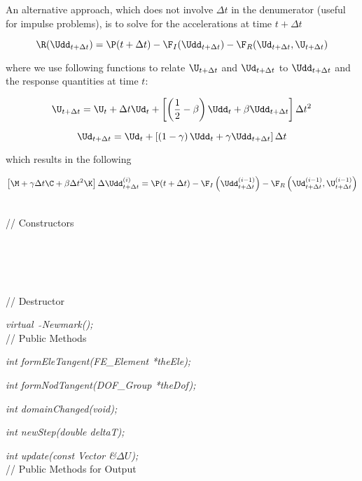 \noindent An alternative approach, which does not involve $\Delta t$
in the denumerator (useful for impulse problems), is to solve for the
accelerations at time $t + \Delta t$ 

$$ \R (\Udd_{t + \Delta t}) = \P(t + \Delta t) - \F_I(\Udd_{t+\Delta t})
- \F_R(\Ud_{t + \Delta t},\U_{t + \Delta t}) $$


\noindent where we use following functions to relate $\U_{t + \Delta
t}$ and $\Ud_{t + \Delta t}$ to $\Udd_{t + \Delta t}$ and the response
quantities at time $t$:

$$
\U_{t + \Delta t} = \U_t + \Delta t \Ud_t + \left[
\left(\frac{1}{2} - \beta\right)\Udd_t + \beta \Udd_{t + \Delta
t}\right] \Delta t^2
$$


$$
\Ud_{t + \Delta t} = \Ud_t + \left[ \left(1 - \gamma\right)\Udd_t +
\gamma\Udd_{t + \Delta t}\right] \Delta t
$$


\noindent which results in the following 

$$ \left[ \M + \gamma \Delta t \C + \beta \Delta t^2 \K \right] \Delta
\Udd_{t + \Delta t}^{(i)} = \P(t + \Delta t) - \F_I\left(\Udd_{t+\Delta 
t}^{(i-1)}\right)
- \F_R\left(\Ud_{t + \Delta t}^{(i-1)},\U_{t + \Delta
t}^{(i-1)}\right) $$



\pagebreak
{} \\
// Constructors 

\\ 
\\ 
\\ \\
// Destructor 

{\em virtual~ $\tilde{}$Newmark();}\\ 

// Public Methods 

{\em int formEleTangent(FE\_Element *theEle);} 

{\em int formNodTangent(DOF\_Group *theDof);} 

{\em int domainChanged(void);}

{\em int newStep(double deltaT);}

{\em int update(const Vector \&$\Delta U$);} \\ 

// Public Methods for Output

